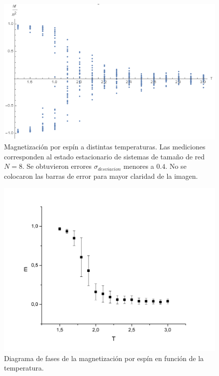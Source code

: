 \documentclass[aps,prb,twocolumn,superscriptaddress,floatfix,longbibliography]{revtex4-2}
\newcounter{para}
\begin{document}
\begin{figure}[h]
    \includegraphics[clip=true,width=\columnwidth]{diagrama_de_fases.png}
    \caption{Magnetización por espín a distintas temperaturas. Las mediciones corresponden al estado estacionario de sistemas de tamaño de red $N=8$. Se obtuvieron errores $\sigma_{desviacion}$ menores a $0.4$. No se colocaron las barras de error para mayor claridad de la imagen.}
     \label{fig:diagrama_de_fases}
\end{figure}

\begin{figure}[h]
    \includegraphics[clip=true,width=\columnwidth]{diagrama_de_fases_pro.png}
    \caption{Diagrama de fases de la magnetización por espín en función de la temperatura.}
     \label{fig:diagrama_de_fases_pro}
\end{figure}
\end{document}
